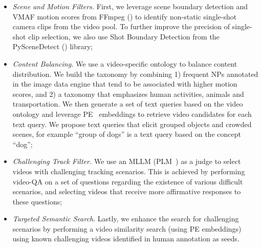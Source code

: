 \documentclass[]{fairmeta}
\begin{document}
\begin{itemize}
	\item \textit{Scene and Motion Filters.} First, we leverage scene boundary detection and VMAF motion scores from FFmpeg (\cite{ffmpeg}) to identify non-static single-shot camera clips from the video pool. To further improve the precision of single-shot clip selection, we also use Shot Boundary Detection from the PySceneDetect (\cite{pyscenedetect}) library;
	\item \textit{Content Balancing.} We use a video-specific ontology to balance content distribution. We build the taxonomy by combining 1) frequent NPs annotated in the image data engine that tend to be associated with higher motion scores, and 2) a taxonomy that emphasizes human activities, animals and transportation. We then generate a set of text queries based on the video ontology and leverage PE~\cite{bolya2025PerceptionEncoder} embeddings to retrieve video candidates for each text query. We propose text queries that elicit grouped objects and crowded scenes, for example ``group of dogs'' is a text query based on the concept ``dog'';
	\item \textit{Challenging Track Filter.} We use an MLLM (PLM~\citep{cho2025PerceptionLM}) as a judge to select videos with challenging tracking scenarios. This is achieved by performing video-QA on a set of questions regarding the existence of various difficult scenarios, and selecting videos that receive more affirmative responses to these questions;
	\item \textit{Targeted Semantic Search}. Lastly, we enhance the search for challenging scenarios by performing a video similarity search (using PE embeddings) using known challenging videos identified in human annotation as seeds.
	
\end{itemize}
\end{document}
